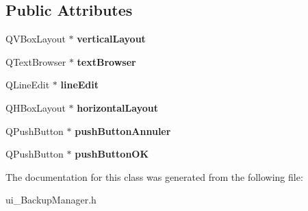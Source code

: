\subsection*{Public Attributes}
\begin{DoxyCompactItemize}
\item 
\hypertarget{class_ui___sauvegarder_a4d192ce8e57342001abc88e4c28cf1e5}{Q\-V\-Box\-Layout $\ast$ {\bfseries vertical\-Layout}}\label{class_ui___sauvegarder_a4d192ce8e57342001abc88e4c28cf1e5}

\item 
\hypertarget{class_ui___sauvegarder_a4f76c572338132629ed164a9829b9e9e}{Q\-Text\-Browser $\ast$ {\bfseries text\-Browser}}\label{class_ui___sauvegarder_a4f76c572338132629ed164a9829b9e9e}

\item 
\hypertarget{class_ui___sauvegarder_a712ecd08d63eade38d71b398bda252f7}{Q\-Line\-Edit $\ast$ {\bfseries line\-Edit}}\label{class_ui___sauvegarder_a712ecd08d63eade38d71b398bda252f7}

\item 
\hypertarget{class_ui___sauvegarder_aa8494994951c50e892745b3e5e7b1313}{Q\-H\-Box\-Layout $\ast$ {\bfseries horizontal\-Layout}}\label{class_ui___sauvegarder_aa8494994951c50e892745b3e5e7b1313}

\item 
\hypertarget{class_ui___sauvegarder_a880a8d2e0bcd5e7da4a16b1612427034}{Q\-Push\-Button $\ast$ {\bfseries push\-Button\-Annuler}}\label{class_ui___sauvegarder_a880a8d2e0bcd5e7da4a16b1612427034}

\item 
\hypertarget{class_ui___sauvegarder_a14fd735b1e68d44e987fbab37897fdfd}{Q\-Push\-Button $\ast$ {\bfseries push\-Button\-O\-K}}\label{class_ui___sauvegarder_a14fd735b1e68d44e987fbab37897fdfd}

\end{DoxyCompactItemize}


The documentation for this class was generated from the following file\-:\begin{DoxyCompactItemize}
\item 
ui\-\_\-\-Backup\-Manager.\-h\end{DoxyCompactItemize}
